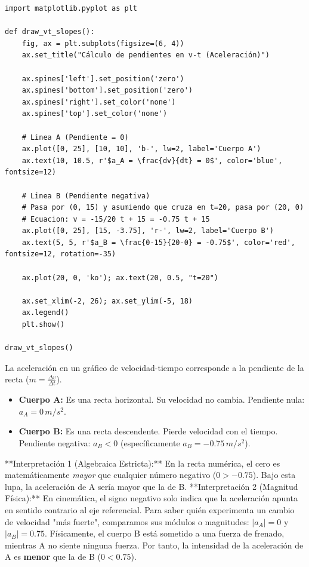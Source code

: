 \documentclass[12pt, a4paper]{article}
\begin{document}
\begin{lstlisting}
import matplotlib.pyplot as plt

def draw_vt_slopes():
    fig, ax = plt.subplots(figsize=(6, 4))
    ax.set_title("Cálculo de pendientes en v-t (Aceleración)")
    
    ax.spines['left'].set_position('zero')
    ax.spines['bottom'].set_position('zero')
    ax.spines['right'].set_color('none')
    ax.spines['top'].set_color('none')
    
    # Linea A (Pendiente = 0)
    ax.plot([0, 25], [10, 10], 'b-', lw=2, label='Cuerpo A')
    ax.text(10, 10.5, r'$a_A = \frac{dv}{dt} = 0$', color='blue', fontsize=12)
    
    # Linea B (Pendiente negativa)
    # Pasa por (0, 15) y asumiendo que cruza en t=20, pasa por (20, 0)
    # Ecuacion: v = -15/20 t + 15 = -0.75 t + 15
    ax.plot([0, 25], [15, -3.75], 'r-', lw=2, label='Cuerpo B')
    ax.text(5, 5, r'$a_B = \frac{0-15}{20-0} = -0.75$', color='red', fontsize=12, rotation=-35)
    
    ax.plot(20, 0, 'ko'); ax.text(20, 0.5, "t=20")
    
    ax.set_xlim(-2, 26); ax.set_ylim(-5, 18)
    ax.legend()
    plt.show()

draw_vt_slopes()
\end{lstlisting}

La aceleración en un gráfico de velocidad-tiempo corresponde a la pendiente de la recta ($m = \frac{\Delta v}{\Delta t}$).
\begin{itemize}
    \item \textbf{Cuerpo A:} Es una recta horizontal. Su velocidad no cambia. Pendiente nula: $a_A = 0 \,\si{m/s^2}$.
    \item \textbf{Cuerpo B:} Es una recta descendente. Pierde velocidad con el tiempo. Pendiente negativa: $a_B < 0$ (específicamente $a_B = -0.75 \,\si{m/s^2}$).
\end{itemize}

**Interpretación 1 (Algebraica Estricta):** En la recta numérica, el cero es matemáticamente \textit{mayor} que cualquier número negativo ($0 > -0.75$). Bajo esta lupa, la aceleración de A sería mayor que la de B.
**Interpretación 2 (Magnitud Física):** En cinemática, el signo negativo solo indica que la aceleración apunta en sentido contrario al eje referencial. Para saber quién experimenta un cambio de velocidad "más fuerte", comparamos sus módulos o magnitudes: $|a_A| = 0$ y $|a_B| = 0.75$. Físicamente, el cuerpo B está sometido a una fuerza de frenado, mientras A no siente ninguna fuerza. Por tanto, la intensidad de la aceleración de A es \textbf{menor} que la de B ($0 < 0.75$).
\end{document}
